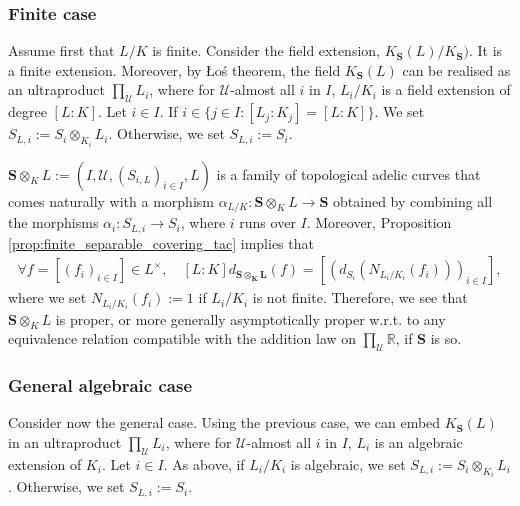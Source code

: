 \documentclass [11pt,reqno]{amsart}
\def\bR{{\mathbb{R}}}
\newcommand{\1}{\mathmybb{1}}
\def\cU{{\mathcal{U}}}
\begin{document}
\subsubsection{Finite case}
\label{subsub:finite_covering_family_tac}

Assume first that $L/K$ is finite. Consider the field extension, $K_{\mathbf{S}}(L)/K_{\mathbf{S}})$. It is a finite extension. Moreover, by \L{}o\'s theorem, the field $K_{\mathbf{S}}(L)$ can be realised as an ultraproduct $\prod_{\cU}L_{i}$, where for $\cU$-almost all $i$ in $I$, $L_{i}/K_{i}$ is a field extension of degree $[L:K]$. Let $i\in I$. If $i\in \{j\in I : [L_{j}:K_{j}]=[L:K]\}$. We set $S_{L,i}:=S_{i}\otimes_{K_{i}}L_{i}$. Otherwise, we set $S_{L,i}:=S_{i}$. 

\begin{proposition-definition}
\label{prop-def:finite_separablecovering_family_tac}
$\mathbf{S}\otimes_{K} L := (I,\cU,(S_{i,L})_{i\in I},L)$ is a family of topological adelic curves that comes naturally with a morphism $\alpha_{L/K} : \mathbf{S}\otimes_{K} L\to \mathbf{S}$ obtained by combining all the morphisms $\alpha_{i}: S_{L,i} \to S_{i}$, where $i$ runs over $I$. Moreover, Proposition \ref{prop:finite_separable_covering_tac} implies that
\begin{align*}
\forall f=[(f_{i})_{i\in I}]\in L^{\times}, \quad [L:K]d_{\mathbf{\mathbf{S}\otimes_{K} L}}(f) = \left[\left(d_{S_{i}}\left(N_{L_{i}/K_{i}}(f_{i})\right)\right)_{i\in I}\right],
\end{align*}
where we set $N_{L_{i}/K_{i}}(f_{i}):=1$ if $L_{i}/K_{i}$ is not finite. Therefore, we see that $\mathbf{S}\otimes_{K} L$ is proper, or more generally asymptotically proper w.r.t. to any equivalence relation compatible with the addition law on $\prod_{\cU}\bR$, if $\mathbf{S}$ is so.
\end{proposition-definition}

\subsubsection{General algebraic case}
\label{subsub:algebraic_covering_family_tac}

Consider now the general case. Using the previous case, we can embed $K_{\mathbf{S}}(L)$ in an ultraproduct $\prod_{\cU}L_{i}$, where for $\cU$-almost all $i$ in $I$, $L_{i}$ is an algebraic extension of $K_{i}$. Let $i\in I$. As above, if $L_{i}/K_{i}$ is algebraic, we set $S_{L,i}:=S_{i}\otimes_{K_{i}}L_{i}$. Otherwise, we set $S_{L,i}:=S_{i}$. 
\end{document}
